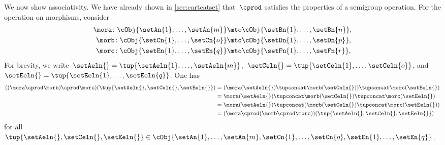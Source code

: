 \begin{example}
    We now show associativity.
    We have already shown in \cref{sec:cartcatset} that~$\cprod$ satisfies the properties of a semigroup operation.
    For the operation on morphisms, consider
    \begin{equation*}
        \begin{aligned}
            \mora\colon \cObj{\setAn{1},\ldots,\setAn{m}} & \mto \cObj{\setBn{1}, \ldots, \setBn{n}}, \\
            \morb\colon \cObj{\setCn{1},\ldots,\setCn{o}} & \mto \cObj{\setDn{1},\ldots,\setDn{p}}, \\
            \morc\colon \cObj{\setEn{1},\ldots,\setEn{q}} & \mto \cObj{\setFn{1},\ldots,\setFn{r}},
        \end{aligned}
    \end{equation*}
    For brevity, we write~$\setAeln{}=\tup{\setAeln{1},\ldots, \setAeln{m}}$,~$\setCeln{}=\tup{\setCeln{1},\ldots, \setCeln{o}}$, and~$\setEeln{}=\tup{\setEeln{1},\ldots,\setEeln{q}}$.
    One has
    \begin{align*}
        ((\mora \cprod \morb)\cprod \morc)(\tup{\setAeln{}, \setCeln{},\setEeln{}})
         & =(\mora(\setAeln{})\tupconcat \morb(\setCeln{}))\tupconcat \morc(\setEeln{}) \\
         & =\mora(\setAeln{})\tupconcat \morb(\setCeln{})\tupconcat \morc(\setEeln{}) \\
         & =\mora(\setAeln{})\tupconcat (\morb(\setCeln{})\tupconcat \morc(\setEeln{})) \\
         & =(\mora \cprod (\morb\cprod \morc))(\tup{\setAeln{}, \setCeln{},\setEeln{}})
    \end{align*}
    for all~$\tup{\setAeln{}, \setCeln{},\setEeln{}}\in \cObj{\setAn{1},\ldots,\setAn{m},\setCn{1},\ldots,\setCn{o},\setEn{1},\ldots,\setEn{q}}$.

\end{example}



